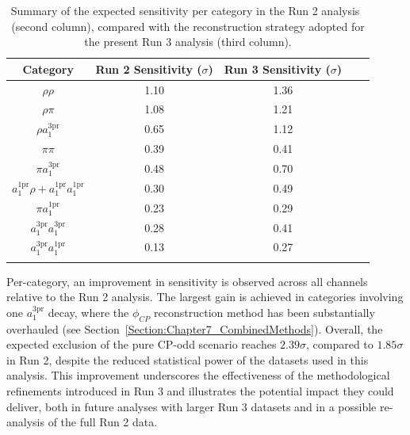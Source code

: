 \begin{table}[!htbp]
\centering
\renewcommand{\arraystretch}{1.5} %
\setlength{\tabcolsep}{10pt} %
\begin{tabular}{ccccc}
\hline
Category & Run 2 Sensitivity ($\sigma$) & Run 3 Sensitivity ($\sigma$)\\
\hline
$\rho\rho$       & 1.10 & 1.36 \\
\arrayrulecolor{lightgray} \hline
$\rho \pi$       & 1.08 & 1.21 \\
\arrayrulecolor{lightgray} \hline
$\rho a_1^\text{3pr}$       & 0.65 & 1.12 \\
\arrayrulecolor{lightgray} \hline
$\pi\pi$       & 0.39 &  0.41 \\
\arrayrulecolor{lightgray} \hline
$\pi a_1^\text{3pr}$  & 0.48 & 0.70 \\
\arrayrulecolor{lightgray} \hline
$a_1^\text{1pr}\rho + a_1^\text{1pr}a_1^\text{1pr}$  & 0.30 & 0.49 \\
\arrayrulecolor{lightgray} \hline
$\pi a_1^\text{1pr}$       & 0.23 & 0.29 \\
\arrayrulecolor{lightgray} \hline
$a_1^\text{3pr} a_1^\text{3pr}$       & 0.28 & 0.41 \\
\arrayrulecolor{lightgray} \hline
$a_1^\text{3pr} a_1^\text{1pr}$       & 0.13 & 0.27 \\
\arrayrulecolor{black} \hline
\end{tabular}
\caption[Comparison of per-category sensitivities in Run 2 with reconstruction strategies in Run 3.]
{Summary of the expected sensitivity per category in the Run 2 analysis~\cite{HiggsCP_CMS_2021} (second column), compared with the reconstruction strategy adopted for the present Run 3 analysis (third column).}
\label{Table:Chapter7_Run2Run3_PerCat_Comp}
\end{table}

Per-category, an improvement in sensitivity is observed across all channels relative to the Run 2 analysis. The largest gain is achieved in categories involving one $a_1^{3\mathrm{pr}}$ decay, where the $\phi_{CP}$ reconstruction method has been substantially overhauled (see Section~\ref{Section:Chapter7_CombinedMethods}). Overall, the expected exclusion of the pure CP-odd scenario reaches $2.39\sigma$, compared to $1.85\sigma$ in Run 2, despite the reduced statistical power of the datasets used in this analysis. This improvement underscores the effectiveness of the methodological refinements introduced in Run 3 and illustrates the potential impact they could deliver, both in future analyses with larger Run 3 datasets and in a possible re-analysis of the full Run 2 data.

